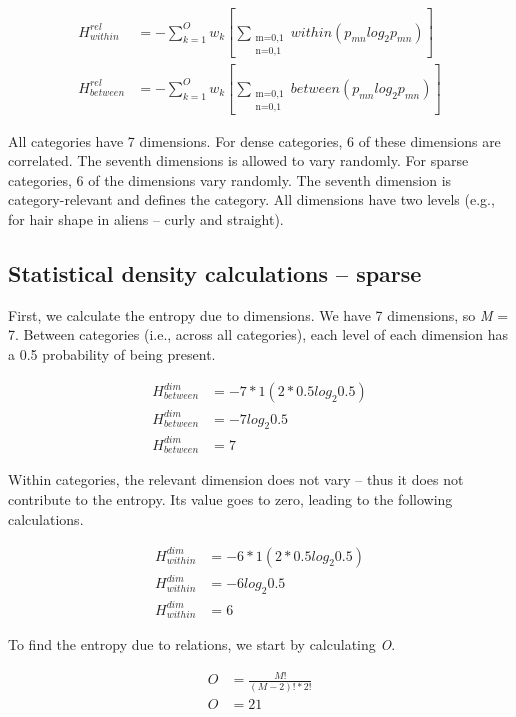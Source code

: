 \documentclass[../dissertation.tex]{subfiles}
\begin{document}
\begin{align*}
H^{rel}_{within} &= -\sum_{k=1}^{O}w_{k}[\sum_{\substack{\text{m=0,1} \\ \text{n=0,1}}}within(p_{mn}log_{2}p_{mn})]\\
H^{rel}_{between} &= -\sum_{k=1}^{O}w_{k}[\sum_{\substack{\text{m=0,1} \\ \text{n=0,1}}}between(p_{mn}log_{2}p_{mn})]
\end{align*}

All categories have 7 dimensions. For dense categories, 6 of these dimensions are correlated. The seventh dimensions is allowed to vary randomly. For sparse categories, 6 of the dimensions vary randomly. The seventh dimension is category-relevant and defines the category. All dimensions have two levels (e.g., for hair shape in aliens -- curly and straight). 

\subsection{Statistical density calculations -- sparse}

First, we calculate the entropy due to dimensions. We have 7 dimensions, so \textit{M} = 7. Between categories (i.e., across all categories), each level of each dimension has a 0.5 probability of being present.

\begin{align*}
H^{dim}_{between} &= -7 * 1(2 * 0.5log_{2}0.5)\\
H^{dim}_{between} &= -7log_{2}0.5\\
H^{dim}_{between} &= 7
\end{align*}

Within categories, the relevant dimension does not vary -- thus it does not contribute to the entropy. Its value goes to zero, leading to the following calculations.

\begin{align*}
H^{dim}_{within} &= -6 * 1(2 * 0.5log_{2}0.5)\\
H^{dim}_{within} &= -6log_{2}0.5\\
H^{dim}_{within} &= 6
\end{align*}

To find the entropy due to relations, we start by calculating \textit{O}.

\begin{align*}
O &= \frac{M!}{(M-2)!*2!}\\
O &= 21
\end{align*}
\end{document}
